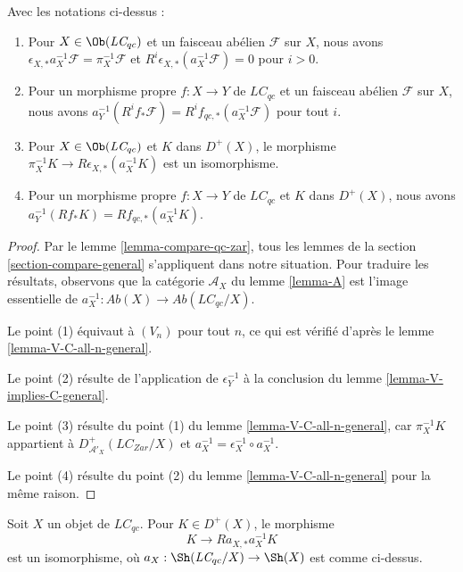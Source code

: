 \begin{lemma}
\label{lemma-V-C-all-n}
Avec les notations ci-dessus :
\begin{enumerate}
\item Pour $X \in \Ob(\textit{LC}_{qc})$ et un faisceau abélien
$\mathcal{F}$ sur $X$, nous avons
$\epsilon_{X, *}a_X^{-1}\mathcal{F} = \pi_X^{-1}\mathcal{F}$ et
$R^i\epsilon_{X, *}(a_X^{-1}\mathcal{F}) = 0$ pour $i > 0$.
\item Pour un morphisme propre $f : X \to Y$ de $\textit{LC}_{qc}$ et un
faisceau abélien $\mathcal{F}$ sur $X$, nous avons
$a_Y^{-1}(R^if_*\mathcal{F}) = R^if_{qc, *}(a_X^{-1}\mathcal{F})$
pour tout $i$.
\item Pour $X \in \Ob(\textit{LC}_{qc})$ et $K$ dans $D^+(X)$, le
morphisme $\pi_X^{-1}K \to R\epsilon_{X, *}(a_X^{-1}K)$ est un isomorphisme.
\item Pour un morphisme propre $f : X \to Y$ de $\textit{LC}_{qc}$ et $K$
dans $D^+(X)$, nous avons
$a_Y^{-1}(Rf_*K) = Rf_{qc, *}(a_X^{-1}K)$.
\end{enumerate}
\end{lemma}

\begin{proof}
Par le lemme \ref{lemma-compare-qc-zar}, tous les lemmes de la
section \ref{section-compare-general} s'appliquent dans notre situation.
Pour traduire les résultats, observons que la catégorie $\mathcal{A}_X$ du
lemme \ref{lemma-A} est l'image essentielle de
$a_X^{-1} : \textit{Ab}(X) \to \textit{Ab}(\textit{LC}_{qc}/X)$.

\medskip\noindent
Le point (1) équivaut à $(V_n)$ pour tout $n$, ce qui est vérifié d'après le
lemme \ref{lemma-V-C-all-n-general}.

\medskip\noindent
Le point (2) résulte de l'application de $\epsilon_Y^{-1}$ à la conclusion
du lemme \ref{lemma-V-implies-C-general}.

\medskip\noindent
Le point (3) résulte du point (1) du
lemme \ref{lemma-V-C-all-n-general}, car $\pi_X^{-1}K$ appartient à
$D^+_{\mathcal{A}'_X}(\textit{LC}_{Zar}/X)$ et
$a_X^{-1} = \epsilon_X^{-1} \circ a_X^{-1}$.

\medskip\noindent
Le point (4) résulte du point (2) du
lemme \ref{lemma-V-C-all-n-general} pour la même raison.
\end{proof}

\begin{lemma}
\label{lemma-cohomological-descent-LC}
Soit $X$ un objet de $\textit{LC}_{qc}$. Pour $K \in D^+(X)$, le morphisme
$$
K \longrightarrow Ra_{X, *}a_X^{-1}K
$$
est un isomorphisme, où
$a_X : \Sh(\textit{LC}_{qc}/X) \to \Sh(X)$ est comme ci-dessus.
\end{lemma}


